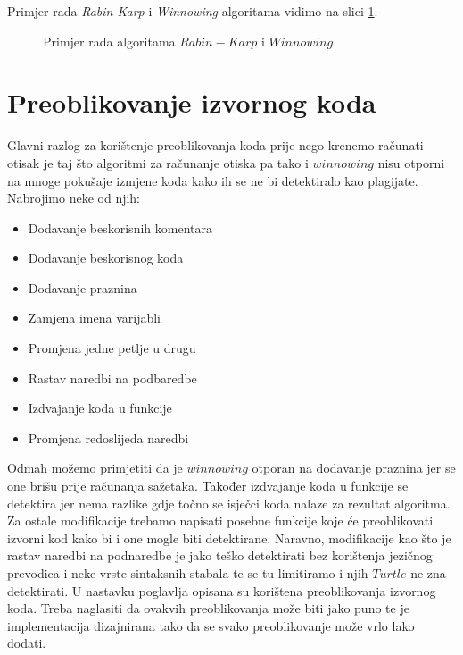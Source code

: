 \noindent Primjer rada \textit{Rabin-Karp} i \textit{Winnowing} algoritama vidimo na slici \ref{fig:winnowing}.

\begin{figure}[htb]
	\centering
	\caption{Primjer rada algoritama $Rabin-Karp$ i $Winnowing$}
	\label{fig:winnowing}
\end{figure}


\section{Preoblikovanje izvornog koda}

Glavni razlog za korištenje preoblikovanja koda prije nego krenemo računati otisak je taj što algoritmi za računanje otiska pa tako i $winnowing$ nisu otporni na mnoge pokušaje izmjene koda kako ih se ne bi detektiralo kao plagijate. Nabrojimo neke od njih:

	\begin{itemize}
		\item Dodavanje beskorisnih komentara
		\item Dodavanje beskorisnog koda
		\item Dodavanje praznina
		\item Zamjena imena varijabli
		\item Promjena jedne petlje u drugu
		\item Rastav naredbi na podbaredbe
		\item Izdvajanje koda u funkcije
		\item Promjena redoslijeda naredbi
	\end{itemize}
	
\noindent Odmah možemo primjetiti da je $winnowing$ otporan na dodavanje praznina jer se one brišu prije računanja sažetaka. Također izdvajanje koda u funkcije se detektira jer nema razlike gdje točno se isječci koda nalaze za rezultat algoritma. Za ostale modifikacije trebamo napisati posebne funkcije koje će preoblikovati izvorni kod kako bi i one mogle biti detektirane. Naravno, modifikacije kao što je rastav naredbi na podnaredbe  je jako teško detektirati bez korištenja jezičnog prevodica i neke vrste sintaksnih stabala te se tu limitiramo i njih $Turtle$ ne zna detektirati. U nastavku poglavlja opisana su korištena preoblikovanja izvornog koda. Treba naglasiti da ovakvih preoblikovanja može biti jako puno te je implementacija dizajnirana tako da se svako preoblikovanje može vrlo lako dodati.


